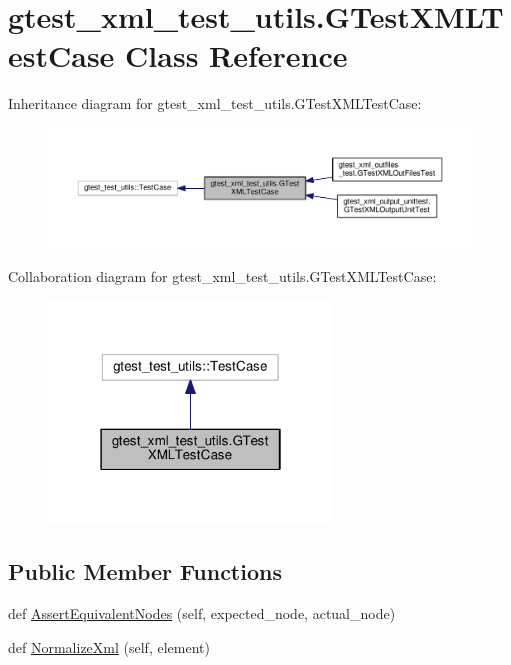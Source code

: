 \hypertarget{classgtest__xml__test__utils_1_1GTestXMLTestCase}{}\section{gtest\+\_\+xml\+\_\+test\+\_\+utils.\+G\+Test\+X\+M\+L\+Test\+Case Class Reference}
\label{classgtest__xml__test__utils_1_1GTestXMLTestCase}


Inheritance diagram for gtest\+\_\+xml\+\_\+test\+\_\+utils.\+G\+Test\+X\+M\+L\+Test\+Case\+:\nopagebreak
\begin{figure}[H]
\begin{center}
\leavevmode
\includegraphics[width=350pt]{classgtest__xml__test__utils_1_1GTestXMLTestCase__inherit__graph}
\end{center}
\end{figure}


Collaboration diagram for gtest\+\_\+xml\+\_\+test\+\_\+utils.\+G\+Test\+X\+M\+L\+Test\+Case\+:\nopagebreak
\begin{figure}[H]
\begin{center}
\leavevmode
\includegraphics[width=214pt]{classgtest__xml__test__utils_1_1GTestXMLTestCase__coll__graph}
\end{center}
\end{figure}
\subsection*{Public Member Functions}
\begin{DoxyCompactItemize}
\item 
def \hyperlink{classgtest__xml__test__utils_1_1GTestXMLTestCase_a977273e8863f4f41d121bb5a64b08d32}{Assert\+Equivalent\+Nodes} (self, expected\+\_\+node, actual\+\_\+node)
\item 
def \hyperlink{classgtest__xml__test__utils_1_1GTestXMLTestCase_ac4823e96c3b5327b25a340a3605447d9}{Normalize\+Xml} (self, element)
\end{DoxyCompactItemize}
